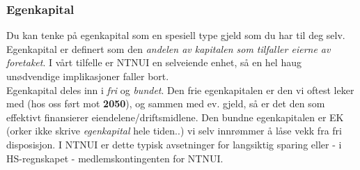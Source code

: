 \hypertarget{ff_egenkap}{}
\subsubsection*{Egenkapital}
Du kan tenke på egenkapital som en spesiell type gjeld som du har til deg selv.
Egenkapital er definert som den \emph{andelen av kapitalen som tilfaller eierne av foretaket}. I vårt tilfelle er NTNUI en selveiende enhet, så en hel haug unødvendige implikasjoner faller bort.\\
Egenkapital deles inn i \emph{fri} og \emph{bundet}. Den frie egenkapitalen er den vi oftest leker med (hos oss ført mot {\bfseries 2050}), og sammen med ev. gjeld, så er det den som effektivt finansierer eiendelene/driftsmidlene. Den bundne egenkapitalen er EK (orker ikke skrive \emph{egenkapital} hele tiden..) vi selv innrømmer å låse vekk fra fri disposisjon. I NTNUI er dette typisk avsetninger for langsiktig sparing eller - i HS-regnskapet - medlemskontingenten for NTNUI.